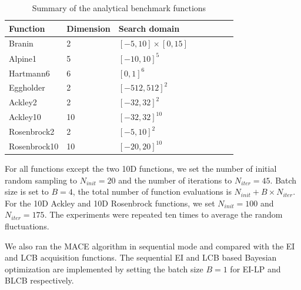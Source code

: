 \begin{table}[!htb]
    \centering
    \caption{Summary of the analytical benchmark functions}
    \label{tab:summaryanalygical}
    \begin{tabular}{llllllll}
        \toprule
         Function           & Dimension        & Search domain             \\ \midrule
         Branin             & 2                & $[-5,  10]\times[0, 15]$  \\
         Alpine1            & 5                & $[-10, 10]^5$             \\
         Hartmann6          & 6                & $[0,   1]^6$              \\
         Eggholder          & 2                & $[-512, 512]^2$           \\
         Ackley2            & 2                & $[-32, 32]^2$             \\
         Ackley10           & 10               & $[-32, 32]^{10}$          \\
         Rosenbrock2        & 2                & $[-5,  10]^2$             \\
         Rosenbrock10       & 10               & $[-20, 20]^{10}$          \\
        \bottomrule
    \end{tabular}
\end{table}


For all functions except the two 10D functions, we set the number of initial
random sampling to $N_{init} = 20$ and the number of iterations to $N_{iter} =
45$. Batch size is set to $B = 4$, the total number of function evaluations is
$N_{init} + B \times N_{iter}$. For the 10D Ackley and 10D Rosenbrock functions, we set
$N_{init} = 100$ and $N_{iter} = 175$. The experiments were repeated ten
times to average the random fluctuations.

We also ran the MACE algorithm in sequential mode and compared with the EI and LCB
acquisition functions. The sequential EI and LCB based Bayesian optimization
are implemented by setting the batch size $B = 1$ for EI-LP and BLCB
respectively.

